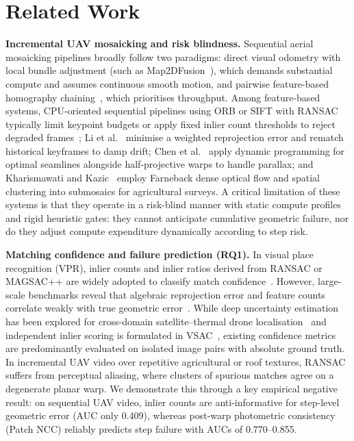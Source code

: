 \documentclass[conference]{IEEEtran}
\begin{document}
\section{Related Work}
\textbf{Incremental UAV mosaicking and risk blindness.} Sequential aerial
mosaicking pipelines broadly follow two paradigms: direct visual odometry with
local bundle adjustment (such as Map2DFusion~\cite{map2dfusion}), which demands
substantial compute and assumes continuous smooth motion, and pairwise
feature-based homography chaining~\cite{hwang2026,li2023,chen2022,dronezaic}, which
prioritises throughput. Among feature-based systems, CPU-oriented sequential
pipelines using ORB or SIFT with RANSAC typically limit keypoint budgets or apply
fixed inlier count thresholds to reject degraded frames~\cite{hwang2026}; Li et
al.~\cite{li2023} minimise a weighted reprojection error and rematch historical
keyframes to damp drift; Chen et al.~\cite{chen2022} apply dynamic programming for
optimal seamlines alongside half-projective warps to handle parallax; and
Kharismawati and Kazic~\cite{dronezaic} employ Farneback dense optical flow and
spatial clustering into submosaics for agricultural surveys. A critical limitation
of these systems is that they operate in a risk-blind manner with static compute
profiles and rigid heuristic gates: they cannot anticipate cumulative geometric
failure, nor do they adjust compute expenditure dynamically according to step risk.

\textbf{Matching confidence and failure prediction (RQ1).} In visual place
recognition (VPR), inlier counts and inlier ratios derived from RANSAC or MAGSAC++
are widely adopted to classify match confidence~\cite{zaffar2024,sferrazza2024}.
However, large-scale benchmarks reveal that algebraic reprojection error and
feature counts correlate weakly with true geometric error~\cite{barath2023,yuan2024}.
While deep uncertainty estimation has been explored for cross-domain satellite--thermal
drone localisation~\cite{uasthn} and independent inlier scoring is formulated in
VSAC~\cite{ivashechkin2021}, existing confidence metrics are predominantly evaluated
on isolated image pairs with absolute ground truth. In incremental UAV video over
repetitive agricultural or roof textures, RANSAC suffers from perceptual aliasing,
where clusters of spurious matches agree on a degenerate planar warp. We demonstrate
this through a key empirical negative result: on sequential UAV video, inlier counts
are anti-informative for step-level geometric error (AUC only 0.409), whereas post-warp
photometric consistency (Patch NCC) reliably predicts step failure with AUCs of
0.770--0.855.
\end{document}
